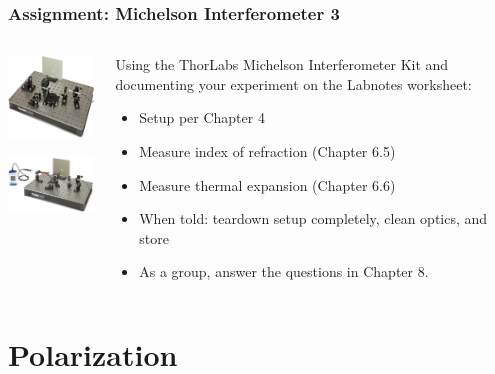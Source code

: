 \documentclass{beamer}
\begin{document}
\begin{frame}\frametitle{Assignment: Michelson Interferometer 3}
\begin{columns}
\begin{column}{5cm}
\begin{center}
\includegraphics[width=4cm]{fig/michelson4.jpg}

\vspace{0.25cm}

\includegraphics[width=4cm]{fig/michelson5.jpg}
\end{center}
\end{column}
\begin{column}{7cm}
Using the ThorLabs Michelson Interferometer Kit and documenting your experiment on the Labnotes worksheet:
\begin{itemize}
\item Setup per Chapter 4
\item Measure index of refraction (Chapter 6.5)
\item Measure thermal expansion (Chapter 6.6)
\item When told: teardown setup completely, clean optics, and store
\item As a group, answer the questions in Chapter 8.
\end{itemize}
\end{column}
\end{columns}
\end{frame}

\section{Polarization}
\end{document}
